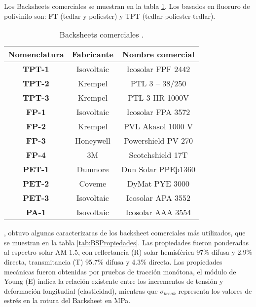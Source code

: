  Los Backsheets comerciales se muestran en la tabla \ref{tab:BScomerciales}. Los basados en fluoruro de polivinilo son: FT (tedlar y poliester) y TPT (tedlar-poliester-tedlar).
 
 \begin{table}[htb]
 	\caption{Backsheets comerciales \citep{Klaus2016}.}
 	\vspace{-0.5em} %
 	\label{tab:BScomerciales}
 	\begin{center}
 		\begin{tabular}{c||c|c}\hline
 			\textbf{Nomenclatura} & \textbf{Fabricante} & \textbf{Nombre comercial} \\ \hline
 			\textbf{TPT-1} & Isovoltaic & Icosolar FPF 2442 \\ \hline
 			\textbf{TPT-2} & Krempel & PTL 3 – 38/250 \\ \hline
 			\textbf{TPT-3} & Krempel & PTL 3 HR 1000V \\ \hline
 			\textbf{FP-1} & Isovoltaic & Icosolar FPA 3572 \\ \hline
 			\textbf{FP-2} & Krempel & PVL Akasol 1000 V \\ \hline
 			\textbf{FP-3} & Honeywell & Powershield PV 270 \\ \hline
 			\textbf{FP-4} & 3M & Scotchshield 17T \\ \hline
 			\textbf{PET-1} & Dunmore &  Dun Solar PPEþ1360 \\ \hline
 			\textbf{PET-2} & Coveme &   DyMat PYE 3000 \\ \hline
 			\textbf{PET-3} & Isovoltaic &    Icosolar APA 3552 \\ \hline
 			\textbf{PA-1} & Isovoltaic &    Icosolar AAA 3554 \\ \hline      
 		\end{tabular}
 	\end{center}
 \end{table} 

\citet{Klaus2016}, obtuvo algunas caracterizaras de los backsheet comerciales más utilizados, que se muestran en la tabla \ref{tab:BSPropiedades}. Las propiedades fueron ponderadas al espectro solar AM 1.5, con reflectancia (R) solar hemisférica 97\% difusa y 2.9\% directa, transmitancia (T) 95.7\% difusa y 4.3\% directa. Las propiedades mecánicas fueron obtenidas por pruebas de tracción monótona, el módulo de Young (E) indica la relación existente entre los incrementos de tensión y deformación longitudial (elasticidad), mientras que $\sigma_{break}$ representa los valores de estrés en la rotura del Backsheet en MPa.  

